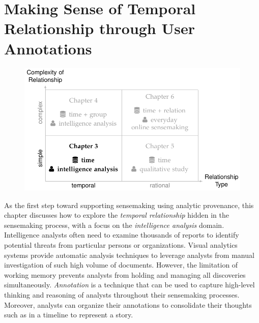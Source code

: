 \chapter{Making Sense of Temporal Relationship through User Annotations}
\label{chap:schemaline}

\graphicspath{{Chapter3/figures/}}

\vspace{0.6in}

\begin{figure}[!htb]
	\centering
	\includegraphics{work-ch3}
\end{figure}

\pagebreak

As the first step toward supporting sensemaking using analytic provenance, this chapter discusses how to explore the \emph{temporal relationship} hidden in the sensemaking process, with a focus on the \emph{intelligence analysis} domain. Intelligence analysts often need to examine thousands of reports to identify potential threats from particular persons or organizations. Visual analytics systems provide automatic analysis techniques to leverage analysts from manual investigation of such high volume of documents. However, the limitation of working memory prevents analysts from holding and managing all discoveries simultaneously. \emph{Annotation} is a technique that can be used to capture high-level thinking and reasoning of analysts throughout their sensemaking processes. Moreover, analysts can organize their annotations to consolidate their thoughts such as in a timeline to represent a story.

